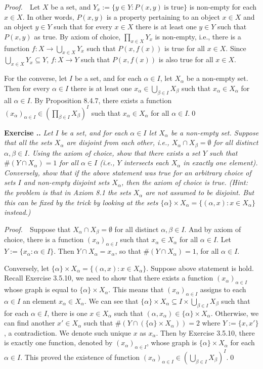 \documentclass{book}
\newcommand{\pff}{\vspace{.25em}\noindent\emph{Proof.}~~}
\newcounter{Exercise}[section]
\renewcommand{\theExercise}{\thesection.\arabic{Exercise}.}
\newcommand{\new}{\vspace{1.5em}\noindent\textbf{{Exercise \stepcounter{Exercise}\textbf{\theExercise}}} }
\begin{document}
\pff Let $X$ be a set, and $Y_x:=\{y\in Y:P(x, y)\ \textrm{is true}\}$ is non-empty for each $x\in X$. In other words, $P(x,y)$ is a property pertaining to an object $x\in X$ and an object $y\in Y$ such that for every $x\in X$ there is at least one $y\in Y$ such that $P(x,y)$ as true. By axiom of choice, $\prod_{x\in X}Y_x$ is non-empty, i.e., there is a function $f:X\to \bigcup_{x\in X}Y_x$ such that $P(x,f(x))$ is true for all $x\in X$. Since $\bigcup_{x\in X}Y_x\subseteq Y$, $f:X\to Y$ such that $P(x,f(x))$ is also true for all $x\in X$.

For the converse, let $I$ be a set, and for each $\alpha\in I$, let $X_\alpha$ be a non-empty set. Then for every $\alpha\in I$ there is at least one $x_\alpha\in\bigcup_{\beta\in I}X_\beta$ such that $x_\alpha\in X_\alpha$ for all $\alpha\in I$. By Proposition 8.4.7, there exists a function $(x_\alpha)_{\alpha\in I}\in(\prod_{\beta\in I}X_\beta)^I$ such that $x_\alpha\in X_\alpha$ for all $\alpha\in I$.\qed

\new\emph{Let $I$ be a set, and for each $\alpha\in I$ let $X_\alpha$ be a non-empty set. Suppose that all the sets $X_\alpha$ are disjoint from each other, i.e., $X_\alpha\cap X_\beta=\emptyset$ for all distinct $\alpha,\beta\in I$. Using the axiom of choice, show that there exists a set $Y$ such that $\#(Y\cap X_\alpha)=1$ for all $\alpha\in I$ (i.e., $Y$ intersects each $X_\alpha$ in exactly one element). Conversely, show that if the above statement was true for an arbitrary choice of sets $I$ and non-empty disjoint sets $X_\alpha$, then the axiom of choice is true. (Hint: the problem is that in Axiom 8.1 the sets $X_\alpha$ are not assumed to be disjoint. But this can be fixed by the trick by looking at the sets $\{\alpha\}\times X_\alpha=\{(\alpha,x):x\in X_\alpha\}$ instead.)}

\pff Suppose that $X_\alpha\cap X_\beta=\emptyset$ for all distinct $\alpha,\beta\in I$. And by axiom of choice, there is a function $(x_\alpha)_{\alpha\in I}$ such that $x_\alpha\in X_\alpha$ for all $\alpha\in I$. Let $Y:=\{x_\alpha:\alpha\in I\}$. Then $Y\cap X_\alpha=x_\alpha$, so that $\#(Y\cap X_\alpha)=1$, for all $\alpha\in I$.

Conversely, let $\{\alpha\}\times X_\alpha=\{(\alpha,x):x\in X_\alpha\}$. Suppose above statement is hold. Recall Exercise 3.5.10, we need to show that there exists a function $(x_\alpha)_{\alpha\in I}$ whose graph is equal to $\{\alpha\}\times X_\alpha$. This means that $(x_\alpha)_{\alpha\in I}$ assigns to each $\alpha\in I$ an element $x_\alpha\in X_\alpha$. We can see that $\{\alpha\}\times X_\alpha\subseteq I\times\bigcup_{\beta\in I}X_\beta$ such that for each $\alpha\in I$, there is one $x\in X_\alpha$ such that $(\alpha,x_\alpha)\in\{\alpha\}\times X_\alpha$. Otherwise, we can find another $x'\in X_\alpha$ such that $\#(Y\cap(\{\alpha\}\times X_\alpha))=2$ where $Y:=\{x,x'\}$, a contradiction. We denote such unique $x$ as $x_\alpha$. Then by Exercise 3.5.10, there is exactly one function, denoted by $(x_\alpha)_{\alpha\in I}$, whose graph is $\{\alpha\}\times X_\alpha$ for each $\alpha\in I$. This proved the existence of function $(x_\alpha)_{\alpha\in I}\in(\bigcup_{\beta\in I}X_\beta)^I$.\qed
\end{document}

